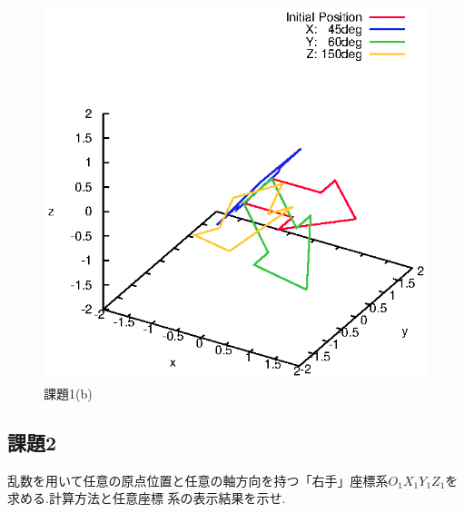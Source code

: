 \documentclass[a4paper,10pt]{jsarticle}
\begin{document}
\begin{figure}[tb]
  \begin{center}
    \includegraphics[clip,width=14cm]{fig/eps/1(b).eps}
  \end{center}
  \caption{課題1(b)}
  \label{fig:課題1(b)}
\end{figure}

\subsection{課題2}
乱数を用いて任意の原点位置と任意の軸方向を持つ「右手」座標系$O_1X_1Y_1Z_1$を求める.計算方法と任意座標
系の表示結果を示せ.
\end{document}
